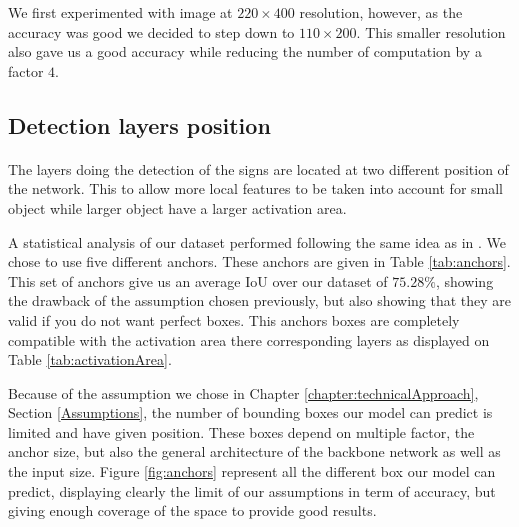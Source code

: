 We first experimented with image at $220\times400$ resolution, however, as the accuracy was good we decided to step down to $110\times200$. This smaller resolution also gave us a good accuracy while reducing the number of computation by a factor $4$.

\subsection{Detection layers position} \label{sec:detectionLayerPos}
\paragraph{}
The layers doing the detection of the signs are located at two different position of the network. This to allow more local features to be taken into account for small object while larger object have a larger activation area.

A statistical analysis of our dataset performed following the same idea as in \cite{yolov3}. We chose to use five different anchors. These anchors are given in Table \ref{tab:anchors}. This set of anchors give us an average IoU over our dataset of $75.28\%$, showing the drawback of the assumption chosen previously, but also showing that they are valid if you do not want perfect boxes. This anchors boxes are completely compatible with the activation area there corresponding layers as displayed on Table \ref{tab:activationArea}.

Because of the assumption we chose in Chapter \ref{chapter:technicalApproach}, Section \ref{Assumptions}, the number of bounding boxes our model can predict is limited and have given position. These boxes depend on multiple factor, the anchor size, but also the general architecture of the backbone network as well as the input size. Figure \ref{fig:anchors} represent all the different box our model can predict, displaying clearly the limit of our assumptions in term of accuracy, but giving enough coverage of the space to provide good results.


